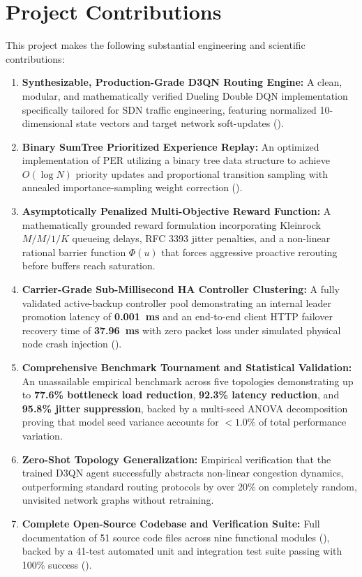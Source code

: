 \documentclass[12pt,a4paper,oneside]{report}
\begin{document}
\section{Project Contributions}
This project makes the following substantial engineering and scientific contributions:
\begin{enumerate}
    \item \textbf{Synthesizable, Production-Grade D3QN Routing Engine:} A clean, modular, and mathematically verified Dueling Double DQN implementation specifically tailored for SDN traffic engineering, featuring normalized 10-dimensional state vectors and target network soft-updates ().
    \item \textbf{Binary SumTree Prioritized Experience Replay:} An optimized implementation of PER utilizing a binary tree data structure to achieve $O(\log N)$ priority updates and proportional transition sampling with annealed importance-sampling weight correction ().
    \item \textbf{Asymptotically Penalized Multi-Objective Reward Function:} A mathematically grounded reward formulation incorporating Kleinrock $M/M/1/K$ queueing delays, RFC 3393 jitter penalties, and a non-linear rational barrier function $\Phi(u)$ that forces aggressive proactive rerouting before buffers reach saturation.
    \item \textbf{Carrier-Grade Sub-Millisecond HA Controller Clustering:} A fully validated active-backup controller pool demonstrating an internal leader promotion latency of \textbf{0.001~ms} and an end-to-end client HTTP failover recovery time of \textbf{37.96~ms} with zero packet loss under simulated physical node crash injection ().
    \item \textbf{Comprehensive Benchmark Tournament and Statistical Validation:} An unassailable empirical benchmark across five topologies demonstrating up to \textbf{77.6\% bottleneck load reduction}, \textbf{92.3\% latency reduction}, and \textbf{95.8\% jitter suppression}, backed by a multi-seed ANOVA decomposition proving that model seed variance accounts for $<1.0\%$ of total performance variation.
    \item \textbf{Zero-Shot Topology Generalization:} Empirical verification that the trained D3QN agent successfully abstracts non-linear congestion dynamics, outperforming standard routing protocols by over 20\% on completely random, unvisited network graphs without retraining.
    \item \textbf{Complete Open-Source Codebase and Verification Suite:} Full documentation of 51 source code files across nine functional modules (), backed by a 41-test automated unit and integration test suite passing with 100\% success ().
\end{enumerate}
\end{document}
